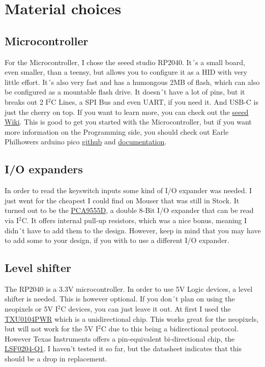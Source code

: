 \documentclass[english, 12pt]{scrartcl}
\begin{document}
	\section{Material choices}
	\subsection{Microcontroller}
	For the Microcontroller, I chose the seeed studio RP2040. It´s a small board, even smaller, than a teensy, but allows you to configure it as a HID with very little effort. It´s also very fast and has a humongous 2MB of flash, which can also be configured as a mountable flash drive. It doesn´t have a lot of pins, but it breaks out 2 I$^2$C Lines, a SPI Bus and even UART, if you need it. And USB-C is just the cherry on top.\newline
	If you want to learn more, you can check out the \href{https://wiki.seeedstudio.com/XIAO-RP2040/}{seeed Wiki}. This is good to get you started with the Microcontroller, but if you want more information on the Programming side, you should check out Earle Philhowers arduino pico \href{https://github.com/earlephilhower/arduino-pico}{github} and \href{https://arduino-pico.readthedocs.io/en/latest/}{documentation}.
	
	\subsection{I/O expanders}
	In order to read the keyswitch inputs some kind of I/O expander was needed. I just went for the cheapest I could find on Mouser that was still in Stock. It turned out to be the \href{https://www.mouser.de/datasheet/2/302/PCA9555-1127545.pdf}{PCA9555D}, a double 8-Bit I/O expander that can be read via I$^2$C. It offers internal pull-up resistors, which was a nice bonus, meaning I didn´t have to add them to the design. However, keep in mind that you may have to add some to your design, if you with to use a different I/O expander.
	
	\subsection{Level shifter}
	The RP2040 is a 3.3V microcontroller. In order to use 5V Logic devices, a level shifter is needed. This is however optional. If you don´t plan on using the neopixels or 5V I$^2$C devices, you can just leave it out. At first I used the \href{https://www.ti.com/lit/gpn/txu0104}{TXU0104PWR} which is a unidirectional chip. This works great for the neopixels, but will not work for the 5V I$^2$C due to this being a bidirectional protocol. However Texas Instruments offers a pin-equivalent bi-directional chip, the \href{https://www.ti.com/lit/gpn/lsf0204-q1}{LSF0204-Q1}. I haven't tested it so far, but the datasheet indicates that this should be a drop in replacement.
	
\end{document}
